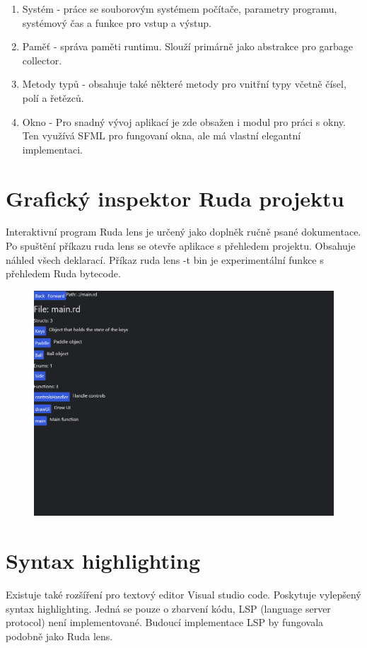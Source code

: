 \documentclass[12pt, a4paper,
twoside,        %
openright
]{report}
\begin{document}
	\begin{enumerate}
		\item Systém - práce se souborovým systémem počítače, parametry programu, systémový čas a funkce pro vstup a výstup.
		\item Paměť - správa paměti runtimu. Slouží primárně jako abstrakce pro garbage collector.
		\item Metody typů - obsahuje také některé metody pro vnitřní typy včetně čísel, polí a řetězců.
		\item Okno - Pro snadný vývoj aplikací je zde obsažen i modul pro práci s okny. Ten využívá SFML pro fungovaní okna, ale má vlastní elegantní implementaci.
	\end{enumerate}
	
	\section{Grafický inspektor Ruda projektu}
	
	Interaktivní program Ruda lens je určený jako doplněk ručně psané dokumentace. Po spuštění příkazu ruda lens se otevře aplikace s přehledem projektu. Obsahuje náhled všech deklarací. Příkaz ruda lens -t bin je experimentální funkce s přehledem Ruda bytecode.
	
	\begin{figure}[h]
		\centering
		\includegraphics[width=0.8\linewidth]{image/lens.png}
	\end{figure}
	
	\section{Syntax highlighting}
	
	Existuje také rozšíření pro textový editor Visual studio code. Poskytuje vylepšený syntax highlighting. Jedná se pouze o zbarvení kódu, LSP (language server protocol) není implementované. Budoucí implementace LSP by fungovala podobně jako Ruda lens.
	
\end{document}
